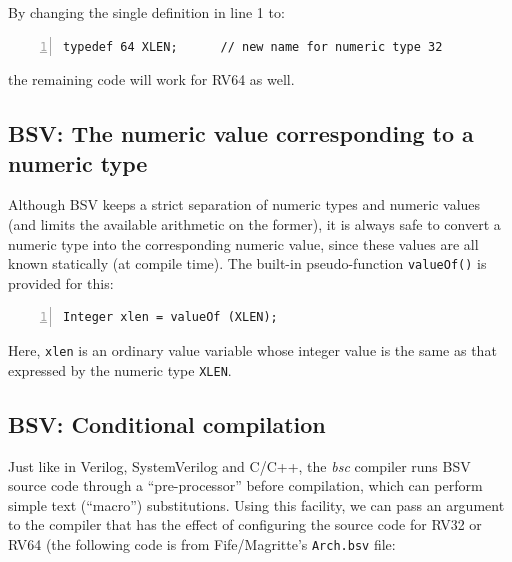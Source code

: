 By changing the single definition in line 1 to:
\begin{Verbatim}[frame=single, numbers=left]
   typedef 64 XLEN;      // new name for numeric type 32
\end{Verbatim}
the remaining code will work for RV64 as well.


\subsection{BSV: The numeric value corresponding to a numeric type}

\label{BSV_value_of_numeric_type}


Although BSV keeps a strict separation of numeric types and numeric
values (and limits the available arithmetic on the former), it is
always safe to convert a numeric type into the corresponding numeric
value, since these values are all known statically (at compile time).
The built-in pseudo-function \verb|valueOf()| is provided for this:

\begin{Verbatim}[frame=single, numbers=left]
   Integer xlen = valueOf (XLEN);
\end{Verbatim}

Here, \verb|xlen| is an ordinary value variable whose integer value is
the same as that expressed by the numeric type \verb|XLEN|.


\subsection{BSV: Conditional compilation}

\label{BSV_Conditional_compilation}


Just like in Verilog, SystemVerilog and C/C++, the \emph{bsc} compiler
runs BSV source code through a ``pre-processor'' before compilation,
which can perform simple text (``macro'') substitutions.  Using this
facility, we can pass an argument to the compiler that has the effect
of configuring the source code for RV32 or RV64 (the following code is
from Fife/Magritte's \verb|Arch.bsv| file:

